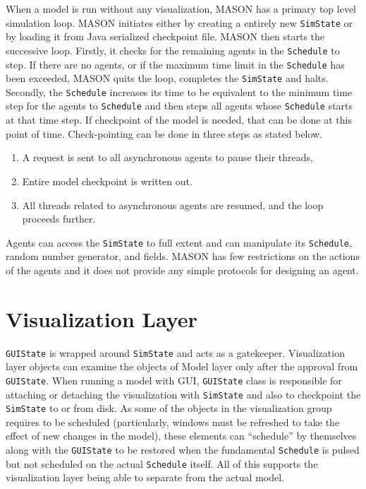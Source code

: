  When a model is run without any visualization, MASON has a primary top level simulation loop. MASON initiates either by creating a entirely new \texttt{SimState} or by loading it from Java serialized checkpoint file. MASON then starts the successive loop. Firstly, it checks for the remaining agents in the \texttt{Schedule} to step. If there are no agents, or if the maximum time limit in the \texttt{Schedule} has been exceeded, MASON quits the loop, completes the \texttt{SimState} and halts. Secondly, the \texttt{Schedule} increases its time to be equivalent to the minimum time step for the agents to \texttt{Schedule} and then steps all agents whose \texttt{Schedule} starts at that time step. If checkpoint of the model is needed, that can be done at this point of time. Check-pointing can be done in three steps as stated below.
 
\begin{enumerate}
 \item A request is sent to all asynchronous agents to pause their threads, 
 \item Entire model checkpoint is written out.
 \item All threads related to asynchronous agents are resumed, and the loop proceeds further. 
\end{enumerate}
\vspace{5mm}

Agents can access the \texttt{SimState} to full extent and can manipulate its \texttt{Schedule}, random number generator, and fields. MASON has few restrictions on the actions of the agents and it does not provide any simple protocols for designing an agent.

\section{Visualization Layer}
\label{Section.three}

\texttt{GUIState} is wrapped around \texttt{SimState} and acts as a gatekeeper. Visualization layer objects can examine the objects of Model layer only after the approval from \texttt{GUIState}. When running a model with GUI, \texttt{GUIState} class is responsible for attaching or detaching the visualization with \texttt{SimState} and also to checkpoint the \texttt{SimState} to or from disk. As some of the objects in the visualization group requires to be scheduled (particularly, windows must be refreshed to take the effect of new changes in the model), these elements can ``schedule'' by themselves along with the \texttt{GUIState} to be restored when the fundamental \texttt{Schedule} is pulsed but not scheduled on the actual \texttt{Schedule} itself. All of this supports the visualization layer being able to separate from the actual model.

